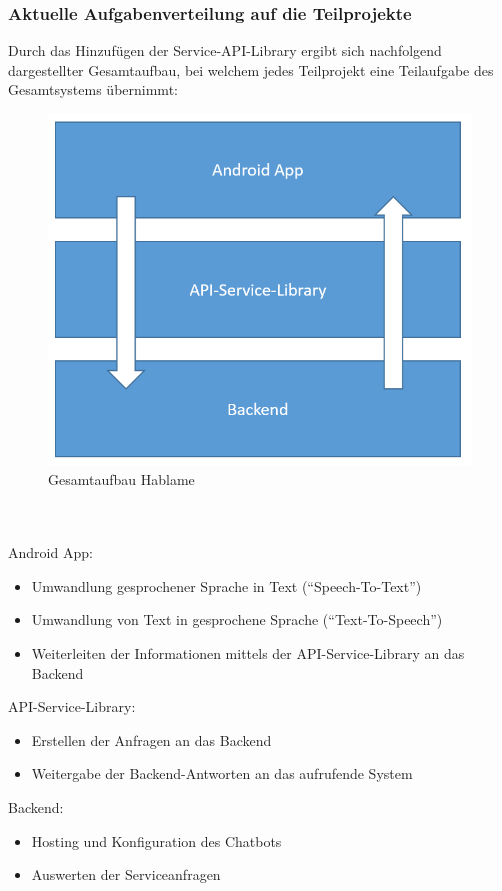 \subsubsection{Aktuelle Aufgabenverteilung auf die Teilprojekte}
Durch das Hinzufügen der Service-API-Library ergibt sich nachfolgend
dargestellter Gesamtaufbau, bei welchem jedes Teilprojekt eine
Teilaufgabe des Gesamtsystems übernimmt:
\begin{figure}[h]
	\centering
	\includegraphics[width=0.7\linewidth]{ks/graphics/arch.png}
	\caption{Gesamtaufbau Hablame}
	\label{fig:arch}
\end{figure}
\\\\
Android App:
\begin{itemize}\itemsep0pt
	\item Umwandlung gesprochener Sprache in Text ("`Speech-To-Text"')
	\item Umwandlung von Text in gesprochene Sprache ("`Text-To-Speech"')
	\item Weiterleiten der Informationen mittels der API-Service-Library an das Backend
\end{itemize}
API-Service-Library:
\begin{itemize}\itemsep0pt
	\item Erstellen der Anfragen an das Backend
	\item Weitergabe der Backend-Antworten an das aufrufende System
\end{itemize}
Backend:
\begin{itemize}\itemsep0pt
	\item Hosting und Konfiguration des Chatbots
	\item Auswerten der Serviceanfragen
\end{itemize}

